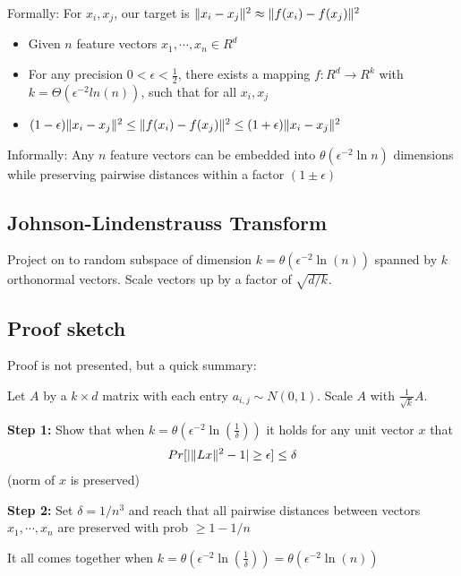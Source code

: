 \documentclass{article}
\begin{document}
  Formally: For $x_i, x_j$, our target is $\lVert x_i - x_j \rVert^2 \approx \lVert f(x_i) - f(x_j) \rVert^2$

  \begin{itemize}
    \item Given $n$ feature vectors $x_1, \cdots, x_n \in R^d$
    \item For any precision $0 \lt \epsilon \lt \frac{1}{2}$, there exists a mapping $f : R^d \rightarrow R^k$ with $k=\Theta(\epsilon^{-2}ln(n))$, such that for all $x_i, x_j$
    \item $(1 - \epsilon) \lVert x_i - x_j \rVert^2 \leq \lVert f(x_i) - f(x_j) \rVert^2 \leq (1 + \epsilon) \lVert x_i - x_j \rVert^2$
  \end{itemize}

  Informally: Any $n$ feature vectors can be embedded into $\theta(\epsilon^{-2} \ln n)$ dimensions while preserving pairwise distances within a factor $(1 \pm \epsilon)$

  \subsection{Johnson-Lindenstrauss Transform}
  Project on to random subspace of dimension $k = \theta(\epsilon^{-2} \ln(n))$ spanned by $k$ orthonormal vectors. Scale vectors up by a factor of $\sqrt{d/k}$. 

  \subsection{Proof sketch}
    Proof is not presented, but a quick summary:

    Let $A$ by a $k \times d$ matrix with each entry $a_{i,j} \sim N(0, 1)$. Scale $A$ with $\frac{1}{\sqrt{k}}A$. 
    
    \textbf{Step 1:} Show that when $k = \theta(\epsilon^{-2} \ln(\frac{1}{\delta}))$ it holds for any unit vector $x$ that 
    \begin{align}
      Pr[
        | \lVert Lx \rVert^2 - 1 | \geq \epsilon
      ] \leq \delta
    \end{align} (norm of $x$ is preserved)

    \textbf{Step 2:} Set $\delta = 1/n^3$ and reach that all pairwise distances between vectors $x_1, \cdots, x_n$ are preserved with prob $\geq 1 - 1/n$

    It all comes together when $k = \theta(\epsilon^{-2} \ln(\frac{1}{\delta})) = \theta(\epsilon^{-2} \ln(n))$
\end{document}
